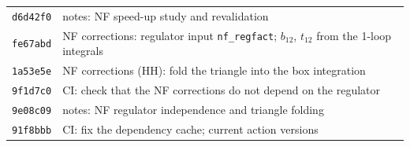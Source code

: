 \documentclass[11pt,a4paper]{article}
\newcommand{\commit}[1]{\texttt{#1}}
\begin{document}
{\begin{tabular}{@{}ll@{}}
\commit{d6d42f0} & notes: NF speed-up study and revalidation\\
\commit{fe67abd} & NF corrections: regulator input \texttt{nf\_regfact}; $b_{12}$, $t_{12}$ from the 1-loop integrals\\
\commit{1a53e5e} & NF corrections (HH): fold the triangle into the box integration\\
\commit{9f1d7c0} & CI: check that the NF corrections do not depend on the regulator\\
\commit{9e08c09} & notes: NF regulator independence and triangle folding\\
\commit{91f8bbb} & CI: fix the dependency cache; current action versions\\
\end{tabular}}
\end{document}
